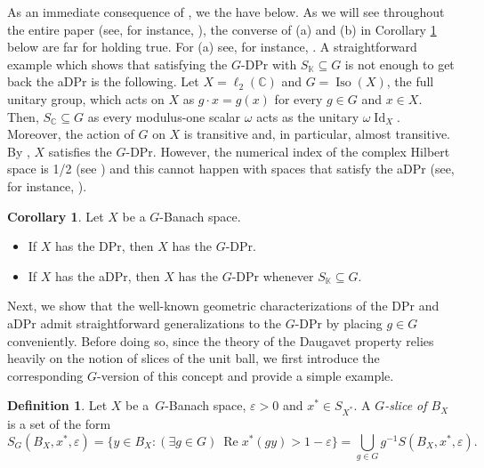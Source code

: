 \documentclass[a4paper,12pt]{amsart}
\theoremstyle{definition}
\newtheorem{corollary}[theorem]{Corollary}
\theoremstyle{definition}
\newtheorem{definition}[theorem]{Definition}
\theoremstyle{remark}
\numberwithin{equation}{section}
\newcommand{\C}{\mathbb{C}}
\newcommand{\K}{\mathbb{K}}
\DeclareMathOperator{\re}{Re}
\DeclareMathOperator{\id}{Id}
\DeclareMathOperator{\iso}{Iso}
\newcommand{\<}{\langle}
\renewcommand{\>}{\rangle}
\newcommand{\e}{\varepsilon}
\begin{document}
	As an immediate consequence of , we the have  below. As we will see throughout the entire paper (see, for instance, ), the converse of (a) and (b) in Corollary \ref{DPr-implies-G-DPr} below are far for holding true. For (a) see, for instance, . A straightforward example which shows that satisfying the $G$-DPr with $S_{\K} \subseteq G$ is not enough to get back the aDPr is the following. Let $X=\ell_2(\C)$ and $G=\iso(X)$, the full unitary group, which acts on $X$ as $g \cdot x = g(x)$ for every $g \in G$ and $x \in X$. Then, $S_{\C} \subseteq G$ as every modulus-one scalar $\omega$ acts as the unitary $\omega \id_X$. Moreover, the action of $G$ on $X$ is transitive and, in particular, almost transitive. By , $X$ satisfies the $G$-DPr. However, the numerical index of the complex Hilbert space is 1/2 (see \cite{Halmos1967}) and this cannot happen with spaces that satisfy the aDPr (see, for instance, \cite[Corollary 12.3.2]{KMRW}).
	
	\begin{corollary} \label{DPr-implies-G-DPr} Let $X$ be a $G$-Banach space.
		\begin{itemize}
			\item[(a)] If $X$ has the DPr, then $X$ has the $G$-DPr.
			\item[(b)] If $X$ has the aDPr, then $X$ has the $G$-DPr whenever $S_{\K} \subseteq G$.
		\end{itemize}
	\end{corollary}
	
	
	Next, we show that the well-known geometric characterizations of the DPr and aDPr admit straightforward generalizations to the $G$-DPr by placing $g \in G$ conveniently. Before doing so, since the theory of the Daugavet property relies heavily on the notion of slices of the unit ball, we first introduce the corresponding $G$-version of this concept and provide a simple example.
	
	\begin{definition}\label{def:G-slice} Let $X$ be a~$G$-Banach space, $\e>0$ and $x^* \in S_{X^*}$. A \emph{$G$-slice of $B_X$} is a set of the form 
		\begin{equation*}
			S_G(B_X, x^*, \e) = \{y \in B_X: (\exists g \in G) \ \re x^*(gy) > 1 - \e \} = \bigcup_{g \in G} g^{-1} S(B_X, x^*, \e).
		\end{equation*}
	\end{definition}
	
\end{document}
